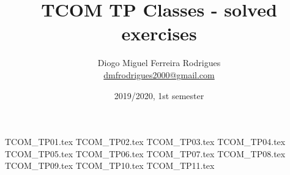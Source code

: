 \documentclass{tcom}
\title{TCOM TP Classes - solved exercises}
\author{Diogo Miguel Ferreira Rodrigues \\ \href{mailto:dmfrodrigues2000@gmail.com}{dmfrodrigues2000@gmail.com}}
\date{2019/2020, 1st semester}
\begin{document}
\begingroup
	\maketitle
	\let\clearpage\relax
	\setcounter{tocdepth}{2}
	\tableofcontents
\endgroup
{TCOM_TP01.tex}
{TCOM_TP02.tex}
{TCOM_TP03.tex}
{TCOM_TP04.tex}
{TCOM_TP05.tex}
{TCOM_TP06.tex}
{TCOM_TP07.tex}
{TCOM_TP08.tex}
{TCOM_TP09.tex}
{TCOM_TP10.tex}
{TCOM_TP11.tex}
\end{document}
